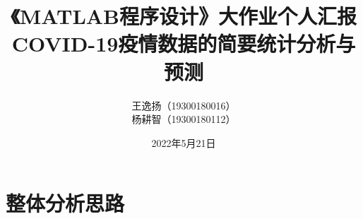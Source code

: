 \documentclass[a4paper, titlepage]{article}
\begin{document}
    \renewcommand{\thefootnote}{\fnsymbol{footnote}}
    \title{{\small《MATLAB程序设计》大作业个人汇报}\\COVID-19疫情数据的简要统计分析与预测\footnotemark[1]}
    \author{王逸扬（19300180016）\\杨耕智（19300180112）{\kaishu }}
    \date{2022年5月21日}
    \maketitle
    \renewcommand{\thefootnote}{\araboc{footnote}}
    \renewcommand{\contentsname}{\centering 目录}
    \tableofcontents

    \section{整体分析思路}
\end{document}
